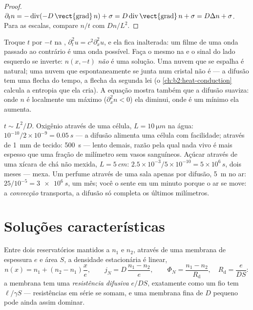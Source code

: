 \begin{proof}
$\partial_t n = -\operatorname{div}(-D\,\vect{\operatorname{grad}}\,n) +
\sigma = D\operatorname{div}\vect{\operatorname{grad}}\,n + \sigma = D\Delta
n + \sigma$. Para as escalas, compare $n/t$ com $Dn/L^2$.
\end{proof}

\begin{remark}\label{rem:b2:particle-diffusion:irreversible}
Troque $t$ por $-t$ na , $\partial_t^2 u = c^2
\partial_x^2 u$, e ela fica inalterada: um filme de uma onda passado ao contrário é
uma onda possível. Faça o mesmo na  e o sinal do
lado esquerdo se inverte: $n(x,-t)$ \emph{não} é uma solução. Uma nuvem que
se espalha é natural; uma nuvem que espontaneamente se junta num cristal
não é --- a difusão tem uma flecha do tempo, a flecha da segunda lei
(o \cref{ch:b2:heat-conduction} calcula a entropia que ela cria). A
equação mostra também que a difusão suaviza: onde $n$ é localmente um
máximo ($\partial_x^2 n < 0$) ela diminui, onde é um mínimo ela
aumenta.
\end{remark}

\begin{example}\label{ex:b2:particle-diffusion:times}
$t \sim L^2/D$. Oxigênio através de uma célula, $L = \qty{10}{\micro m}$ na água:
$10^{-10}/2 \times 10^{-9} = \qty{0.05}{s}$ --- a difusão alimenta uma célula com
facilidade; através de \qty{1}{mm} de tecido: \qty{500}{s} --- lento demais, razão pela
qual nada vivo é mais espesso que uma fração de milímetro sem
vasos sanguíneos. Açúcar através de uma xícara de chá não mexida, $L = \qty{5}{cm}$:
$2.5 \times 10^{-3}/5 \times 10^{-10} = 5 \times 10^6\,\unit{s}$, dois meses
--- mexa. Um perfume através de uma sala apenas por difusão, \qty{5}{m} no
ar: $25/10^{-5} = \qty{3e6}{s}$, um mês; você o sente em um minuto
porque o ar se move: a \emph{convecção} transporta, a difusão só
completa os últimos milímetros.
\end{example}

\section{Soluções características}

\begin{proposition}\label{prop:b2:particle-diffusion:membrane}
Entre dois reservatórios mantidos a $n_1$ e $n_2$, através de uma membrana de
espessura $e$ e área $S$, a densidade estacionária é linear,
\[
n(x) = n_1 + (n_2 - n_1)\frac{x}{e}, \qquad
j_N = D\,\frac{n_1 - n_2}{e}, \qquad
\Phi_N = \frac{n_1 - n_2}{R_{\text{d}}}, \quad R_{\text{d}} = \frac{e}{DS}:
\]
a membrana tem uma \emph{resistência difusiva} $e/DS$, exatamente como um fio
tem $\ell/\gamma S$ --- resistências em série se somam, e uma membrana fina
de $D$ pequeno pode ainda assim dominar.
\end{proposition}

